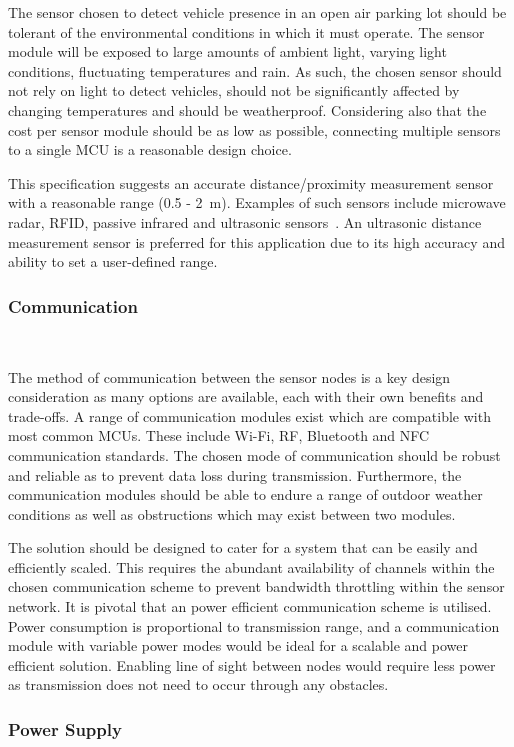 \documentclass[10pt,twocolumn]{witseiepaper}
\begin{document}
			The sensor chosen to detect vehicle presence in an open air parking lot should be tolerant of the environmental conditions in which it must operate. The sensor module will be exposed to large amounts of ambient light, varying light conditions, fluctuating temperatures and rain. As such, the chosen sensor should not rely on light to detect vehicles, should not be significantly affected by changing temperatures and should be weatherproof. Considering also that the cost per sensor module should be as low as possible, connecting multiple sensors to a single MCU is a reasonable design choice.
			
			This specification suggests an accurate distance/proximity measurement sensor with a reasonable range (0.5 - 2~m). Examples of such sensors include microwave radar, RFID, passive infrared and ultrasonic sensors~\cite{parkingSystem}. An ultrasonic distance measurement sensor is preferred for this application due to its high accuracy and ability to set a user-defined range.
			
		\subsubsection{Communication} $   $

			The method of communication between the sensor nodes is a key design consideration as many options are available, each with their own benefits and trade-offs. A range of communication modules exist which are compatible with most common MCUs. These include Wi-Fi, RF, Bluetooth and NFC communication standards. The chosen mode of communication should be robust and reliable as to prevent data loss during transmission. Furthermore, the communication modules should be able to endure a range of outdoor weather conditions as well as obstructions which may exist between two modules.

			The solution should be designed to cater for a system that can be easily and efficiently scaled. This requires the abundant availability of channels within the chosen communication scheme to prevent bandwidth throttling within the sensor network. It is pivotal that an power efficient communication scheme is utilised. Power consumption is proportional to transmission range, and a communication module with variable power modes would be ideal for a scalable and power efficient solution. Enabling line of sight between nodes would require less power as transmission does not need to occur through any obstacles.
			
		\subsubsection{Power Supply} $   $
			
\end{document}
